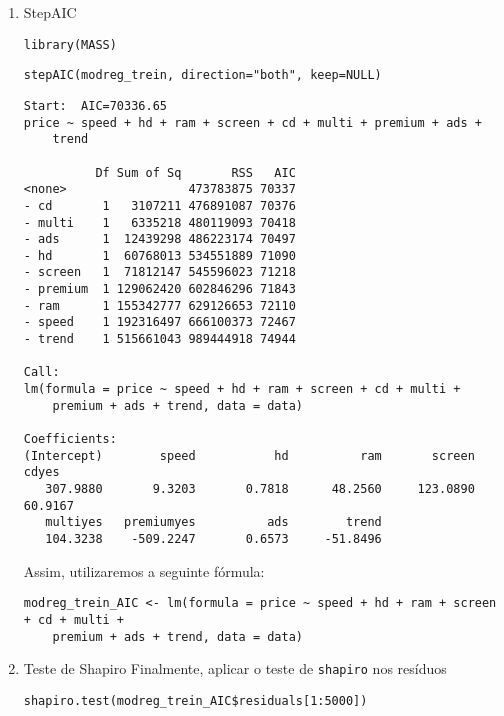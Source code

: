 \documentclass[11pt]{article}
\begin{document}
\begin{enumerate}
\begin{verbatim}
\end{verbatim}

\item StepAIC
\label{sec:org635e1fe}
\begin{verbatim}
library(MASS)
\end{verbatim}

\begin{verbatim}
stepAIC(modreg_trein, direction="both", keep=NULL)
\end{verbatim}

\begin{verbatim}
Start:  AIC=70336.65
price ~ speed + hd + ram + screen + cd + multi + premium + ads + 
    trend

          Df Sum of Sq       RSS   AIC
<none>                 473783875 70337
- cd       1   3107211 476891087 70376
- multi    1   6335218 480119093 70418
- ads      1  12439298 486223174 70497
- hd       1  60768013 534551889 71090
- screen   1  71812147 545596023 71218
- premium  1 129062420 602846296 71843
- ram      1 155342777 629126653 72110
- speed    1 192316497 666100373 72467
- trend    1 515661043 989444918 74944

Call:
lm(formula = price ~ speed + hd + ram + screen + cd + multi + 
    premium + ads + trend, data = data)

Coefficients:
(Intercept)        speed           hd          ram       screen        cdyes  
   307.9880       9.3203       0.7818      48.2560     123.0890      60.9167  
   multiyes   premiumyes          ads        trend  
   104.3238    -509.2247       0.6573     -51.8496  

\end{verbatim}

Assim, utilizaremos a seguinte fórmula:
\begin{verbatim}
modreg_trein_AIC <- lm(formula = price ~ speed + hd + ram + screen + cd + multi + 
    premium + ads + trend, data = data)
\end{verbatim}

\item Teste de Shapiro
\label{sec:orgdf4e228}
Finalmente, aplicar o teste de \texttt{shapiro} nos resíduos

\begin{verbatim}
shapiro.test(modreg_trein_AIC$residuals[1:5000])
\end{verbatim}


\end{enumerate}
\end{document}

